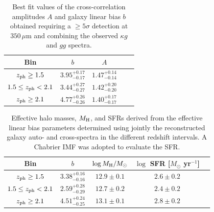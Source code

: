 \begin{table}[t]
\centering
\begin{tabular}{ccccc}
\toprule
\midrule
Bin & $b$ & $A$ \\
\midrule
$z_{\rm{ph}} \ge 1.5$  & $3.95^{+0.17}_{-0.17}$  &  $1.47^{+0.14}_{-0.14}$ \\
$1.5 \le z_{\rm{ph}} < 2.1$  & $3.44^{+0.27}_{-0.27}$   &  $1.42^{+0.20}_{-0.20}$ \\
$z_{\rm{ph}} \ge 2.1$  & $4.77^{+0.26}_{-0.26}$   &  $1.40^{+0.17}_{-0.17}$\\
\bottomrule
\end{tabular}
\caption{Best fit values of the cross-correlation amplitudes $A$ and galaxy linear bias $b$ obtained requiring a $\ge 5\sigma$ detection at $350\,\mu$m and combining the observed $\kappa g$ and $gg$ spectra.\label{b_a_results_flux}}
\end{table}

%

\begin{table}[t]
\centering
\begin{tabular}{ccccc}
\toprule
\midrule
Bin & $b$ & $\log{M_{\rm H}/M_{\odot}}$ &
$\log$ SFR [$M_{\odot}$ yr$^{-1}$] \\
\midrule
$z_{\rm{ph}} \ge 1.5$  & $3.38^{+0.16}_{-0.16}$  &  $12.9 \pm
0.1$ & $2.6 \pm 0.2$\\
$1.5 \le z_{\rm{ph}} < 2.1$  & $2.59^{+0.28}_{-0.29}$   &  $12.7
\pm 0.2$  & $2.4\pm 0.2$ \\
$z_{\rm{ph}} \ge 2.1$  & $4.51^{+0.24}_{-0.25}$   &  $13.1 \pm
0.1$ & $2.8\pm 0.2$ \\
\bottomrule
\end{tabular}
\caption{Effective halo masses, $M_{\rm H}$, and SFRs  derived from the effective linear bias parameters determined using jointly the reconstructed galaxy auto- and cross-spectra in the different redshift intervals. A Chabrier IMF \citep{Chabrier2003} was adopted to evaluate the SFR.\label{SFR_results}}
\end{table}

